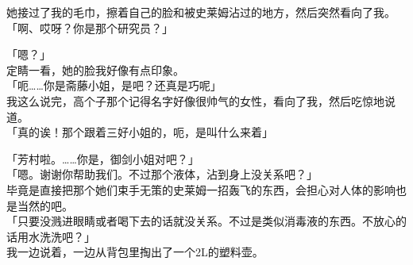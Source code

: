 她接过了我的毛巾，擦着自己的脸和被史莱姆沾过的地方，然后突然看向了我。\\

「啊、哎呀？你是那个研究员？」

「嗯？」\\

定睛一看，她的脸我好像有点印象。\\

「呃……你是斋藤小姐，是吧？还真是巧呢」\\

我这么说完，高个子那个记得名字好像很帅气的女性，看向了我，然后吃惊地说道。\\

「真的诶！那个跟着三好小姐的，呃，是叫什么来着」

「芳村啦。……你是，御剑小姐对吧？」\\

「嗯。谢谢你帮助我们。不过那个液体，沾到身上没关系吧？」\\

毕竟是直接把那个她们束手无策的史莱姆一招轰飞的东西，会担心对人体的影响也是当然的吧。\\

「只要没溅进眼睛或者喝下去的话就没关系。不过是类似消毒液的东西。不放心的话用水洗洗吧？」\\

我一边说着，一边从背包里掏出了一个2L的塑料壶。\\

